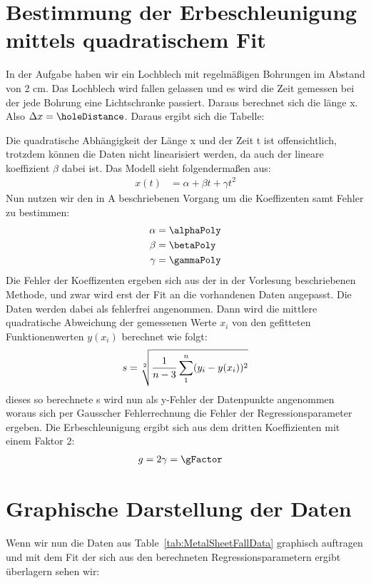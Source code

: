 \documentclass[11pt]{article}
\begin{document}
    \section{Bestimmung der Erbeschleunigung mittels quadratischem Fit}
    
    In der Aufgabe haben wir ein Lochblech mit regelmäßigen Bohrungen im Abstand von 2 cm. Das Lochblech wird fallen gelassen und es wird die Zeit gemessen
    bei der jede Bohrung eine Lichtschranke passiert. Daraus berechnet sich die länge x. Also $\Delta x = \holeDistance$. Daraus ergibt sich die Tabelle:
    
    
    
    Die quadratische Abhängigkeit der Länge x und der Zeit t ist offensichtlich, trotzdem können die Daten nicht linearisiert werden, da auch
    der lineare koeffizient $\beta$ dabei ist. Das Modell sieht folgendermaßen aus:
    \begin{align*}
        x(t) &= \alpha + \beta t + \gamma t^2
    \end{align*}
    Nun nutzen wir den in A beschriebenen Vorgang um die Koeffizenten samt Fehler zu bestimmen:
    \begin{align*}
        \alpha &= \alphaPoly \\
        \beta &= \betaPoly \\
        \gamma &= \gammaPoly
    \end{align*}
    Die Fehler der Koeffizenten ergeben sich aus der in der Vorlesung beschriebenen Methode, und zwar wird erst der Fit an die vorhandenen Daten angepasst. Die Daten werden dabei als 
    fehlerfrei angenommen. Dann wird die mittlere quadratische Abweichung der gemessenen Werte $x_i$ von den gefitteten Funktionenwerten $y(x_i)$ berechnet wie folgt:
    \begin{equation*}
        s = \sqrt[2]{\frac{1}{n-3}\\\sum_{1}^{n}(y_i - y(x_i))^2}
    \end{equation*}
    dieses so berechnete s wird nun als y-Fehler der Datenpunkte angenommen woraus sich per Gausscher Fehlerrechnung die Fehler der Regressionsparameter ergeben.
    Die Erbeschleunigung ergibt sich aus dem dritten Koeffizienten mit einem Faktor 2:
    \begin{align*}
        g &= 2 \gamma = \gFactor
    \end{align*}
    \section{Graphische Darstellung der Daten}
    Wenn wir nun die Daten aus Table~\ref{tab:MetalSheetFallData} graphisch auftragen und mit dem Fit der sich aus den berechneten Regressionsparametern
    ergibt überlagern sehen wir:

    
    
    
\end{document}
